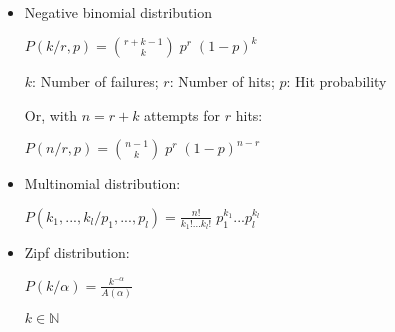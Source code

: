\documentclass{article}
\begin{document}
\begin{itemize}
\item Negative binomial distribution

$P(k/r,p) = \binom{r + k - 1}{k} \; p^{r} \; (1 - p)^{k}$

$k$: Number of failures; $r$: Number of hits; $p$: Hit probability

Or, with $n = r + k$ attempts for $r$ hits:

$P(n/r,p) = \binom{n - 1}{k} \; p^{r} \; (1 - p)^{n - r}$

\item Multinomial distribution:

$P(k_{1},...,k_{l}/p_{1},...,p_{l}) = \frac{n!}{k_{1}!...k_{l}!} \; p_{1}^{k_{1}}...p_{l}^{k_{l}}$

\item Zipf distribution:

$P(k/\alpha) = \frac{k^{-\alpha}}{A(\alpha)}$

$k \in \mathbb{N}$
        
\end{itemize}
\end{document}
